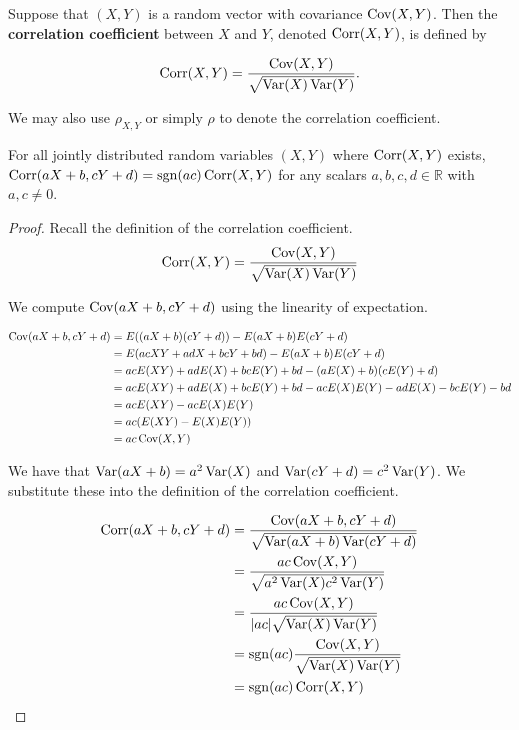 \begin{definition}
	Suppose that $(X,Y)$ is a random vector with covariance $\operatorname{Cov}(X,Y)$. Then the \textbf{correlation coefficient} between $X$ and $Y$, denoted $\operatorname{Corr}(X,Y)$, is defined by

	$$\operatorname{Corr}(X,Y)=\frac{\operatorname{Cov}(X,Y)}{\sqrt{\operatorname{Var}(X)\operatorname{Var}(Y)}}.$$
\end{definition}

We may also use $\rho_{X,Y}$ or simply $\rho$ to denote the correlation coefficient.

\begin{theorem}[]
	For all jointly distributed random variables $(X,Y)$ where $\operatorname{Corr}(X,Y)$ exists, $\operatorname{Corr}(aX+b,cY+d)=\operatorname{sgn}(ac)\operatorname{Corr}(X,Y)$ for any scalars $a,b,c,d\in\mathbb R$ with $a,c\neq 0$.
\end{theorem}

\begin{proof}
	Recall the definition of the correlation coefficient. $$\operatorname{Corr}(X,Y)=\frac{\operatorname{Cov}(X,Y)}{\sqrt{\operatorname{Var}(X)\operatorname{Var}(Y)}}$$

	We compute $\operatorname{Cov}(aX+b,cY+d)$ using the linearity of expectation.

	\begin{align*}
		\operatorname{Cov}(aX+b,cY+d)&=E((aX+b)(cY+d))-E(aX+b)E(cY+d)\\
		&=E(acXY+adX+bcY+bd)-E(aX+b)E(cY+d)\\
		&=acE(XY)+adE(X)+bcE(Y)+bd-(aE(X)+b)(cE(Y)+d)\\
		&=acE(XY)+adE(X)+bcE(Y)+bd-acE(X)E(Y)-adE(X)-bcE(Y)-bd\\
		&=acE(XY)-acE(X)E(Y)\\
		&=ac(E(XY)-E(X)E(Y))\\
		&=ac\operatorname{Cov}(X,Y)
	\end{align*}

	We have that $\operatorname{Var}(aX+b)=a^2\operatorname{Var}(X)$ and $\operatorname{Var}(cY+d)=c^2\operatorname{Var}(Y)$. We substitute these into the definition of the correlation coefficient.

	\begin{align*}
		\operatorname{Corr}(aX+b,cY+d)&=\frac{\operatorname{Cov}(aX+b,cY+d)}{\sqrt{\operatorname{Var}(aX+b)\operatorname{Var}(cY+d)}}\\
		&=\frac{ac\operatorname{Cov}(X,Y)}{\sqrt{a^2\operatorname{Var}(X)c^2\operatorname{Var}(Y)}}\\
		&=\frac{ac\operatorname{Cov}(X,Y)}{|ac|\sqrt{\operatorname{Var}(X)\operatorname{Var}(Y)}}\\
		&=\operatorname{sgn}(ac)\frac{\operatorname{Cov}(X,Y)}{\sqrt{\operatorname{Var}(X)\operatorname{Var}(Y)}}\\
		&=\operatorname{sgn}(ac)\operatorname{Corr}(X,Y)
	\end{align*}
\end{proof}

